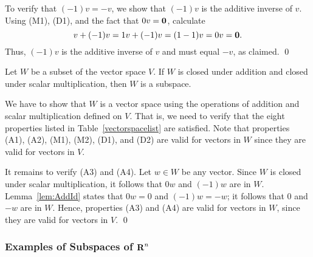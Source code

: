 \documentclass{ximera}
\begin{document}
To verify that $(-1)v = -v$, we show that $(-1)v$ is the
additive inverse of $v$.  Using (M1), (D1), and the fact that $0v = {\bf 0}$, 
calculate
\[
     v + (-1)v = 1v + (-1)v =(1-1)v = 0v = {\bf 0}.
\]
Thus, $(-1)v$ is the additive inverse of $v$ and must equal $-v$, as
claimed.  \qed

\begin{thm}  \label{T:subspaces}
Let $W$ be a subset of the vector space $V$. If $W$ is closed under addition 
and closed under scalar multiplication, then $W$ is a subspace.
\end{thm}
\proof  We have to show that $W$ is a vector space using the operations 
of addition and scalar multiplication defined on $V$.  That is, we need to
verify that the eight properties listed in Table~\ref{vectorspacelist} are 
satisfied.  Note that properties (A1), (A2), (M1), (M2), (D1), and (D2) are 
valid for vectors in $W$ since they are valid for vectors in $V$.

It remains to verify (A3) and (A4).  Let $w\in W$ be any vector.
Since $W$ is closed under scalar multiplication, it follows that
$0w$ and $(-1)w$ are in $W$. Lemma~\ref{lem:AddId} states that
$0w=0$ and $(-1)w=-w$; it follows that $0$ and $-w$ are in $W$.
Hence, properties (A3) and (A4) are valid for vectors in $W$,
since they are valid for vectors in $V$.  \qed

\subsubsection*{Examples of Subspaces of $\mbox{$\bf{R}$}^n$}
\end{document}
